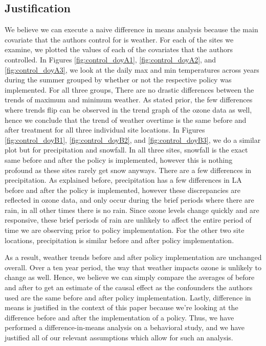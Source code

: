 \documentclass{article}
\begin{document}
\subsection{Justification}

We believe we can execute a naive difference in means analysis because the main covariate that the authors control for is weather. For each of the sites we examine, we plotted the values of each of the covariates that the authors controlled. In Figures \ref{fig:control_doyA1}, \ref{fig:control_doyA2}, and \ref{fig:control_doyA3}, we look at the daily max and min temperatures across years during the summer grouped by whether or not the respective policy was implemented. For all three groups, There are no drastic differences between the trends of maximum and minimum weather. As stated prior, the few differences where trends flip can be observed in the trend graph of the ozone data as well, hence we conclude that the trend of weather overtime is the same before and after treatment for all three individual site locations. In Figures \ref{fig:control_doyB1}, \ref{fig:control_doyB2}, and \ref{fig:control_doyB3}, we do a similar plot but for precipitation and snowfall. In all three sites, snowfall is the exact same before and after the policy is implemented, however this is nothing profound as these sites rarely get snow anyways. There are a few differences in precipitation. As explained before, precipitation has a few differences in LA before and after the policy is implemented, however these discrepancies are reflected in ozone data, and only occur during the brief periods where there are rain, in all other times there is no rain. Since ozone levels change quickly and are responsive, these brief periods of rain are unlikely to affect the entire period of time we are observing prior to policy implementation. For the other two site locations, precipitation is similar before and after policy implementation. 

As a result, weather trends before and after policy implementation are unchanged overall. Over a ten year period, the way that weather impacts ozone is unlikely to change as well. Hence, we believe we can simply compare the averages of before and after to get an estimate of the causal effect as the confounders the authors used are the same before and after policy implementation. Lastly, difference in means is justified in the context of this paper because we're looking at the difference before and after the implementation of a policy. Thus, we have performed a difference-in-means analysis on a behavioral study, and we have justified all of our relevant assumptions which allow for such an analysis. 
\end{document}
